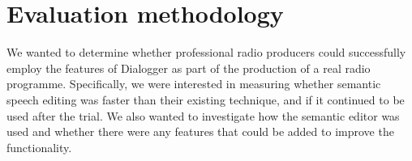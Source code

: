 






\section{Evaluation methodology}\label{sec:screen-methods}

We wanted to determine whether professional radio producers could successfully employ the features of Dialogger as part
of the production of a real radio programme. Specifically, we were interested in measuring whether semantic speech
editing was faster than their existing technique, and if it continued to be used after the trial.  We also wanted to
investigate how the semantic editor was used and whether there were any features that could be added to improve the
functionality.

